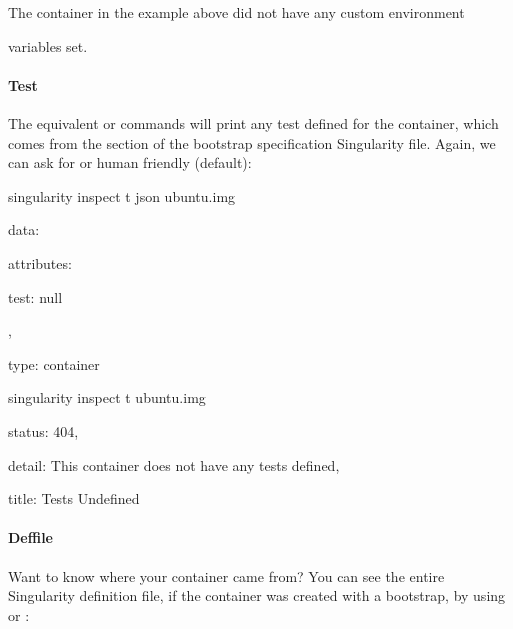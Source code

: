 \documentclass[letterpaper,10pt,english]{sphinxmanual}
\begin{document}
The container in the example above did not have any custom environment

variables set.


\paragraph{Test}
\label{\detokenize{appendix:test}}
The equivalent  or  commands will print any test defined for the
container, which comes from the   section of the bootstrap specification
Singularity file. Again, we can ask for  or human friendly (default):

%
\begin{sphinxVerbatim}[commandchars=\\\{\}]
\PYGZdl{} singularity \PYGZhy{}\PYGZhy{}inspect \PYGZhy{}t \PYGZhy{}\PYGZhy{}json ubuntu.img

\PYGZob{}

    \PYGZdq{}data\PYGZdq{}: \PYGZob{}

        \PYGZdq{}attributes\PYGZdq{}: \PYGZob{}

            \PYGZdq{}test\PYGZdq{}: null

        \PYGZcb{},

        \PYGZdq{}type\PYGZdq{}: \PYGZdq{}container\PYGZdq{}

    \PYGZcb{}

\PYGZcb{}


\PYGZdl{} singularity inspect \PYGZhy{}t  ubuntu.img

\PYGZob{}

    \PYGZdq{}status\PYGZdq{}: 404,

    \PYGZdq{}detail\PYGZdq{}: \PYGZdq{}This container does not have any tests defined\PYGZdq{},

    \PYGZdq{}title\PYGZdq{}: \PYGZdq{}Tests Undefined\PYGZdq{}

\PYGZcb{}
\end{sphinxVerbatim}


\paragraph{Deffile}
\label{\detokenize{appendix:deffile}}
Want to know where your container came from? You can see the entire
Singularity definition file, if the container was created with a
bootstrap, by using  or :
\end{document}
